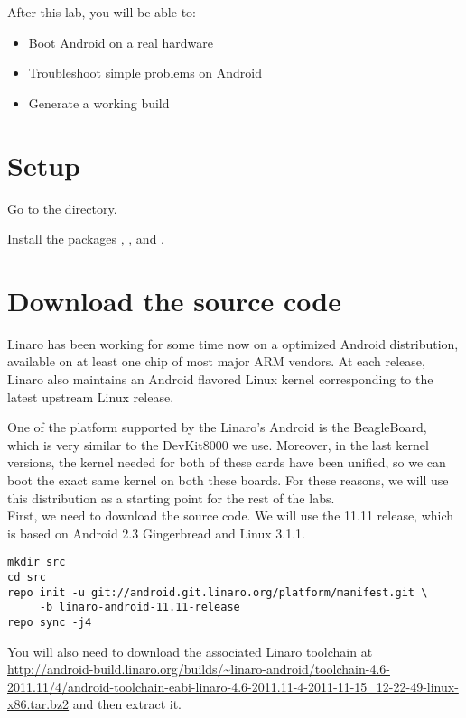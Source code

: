 
After this lab, you will be able to:
\begin{itemize}
  \item Boot Android on a real hardware
  \item Troubleshoot simple problems on Android
  \item Generate a working build
\end{itemize}

\section{Setup}

Go to the  directory.

Install the packages , ,
 and .

\section{Download the source code}

Linaro has been working for some time now on a optimized Android distribution,
available on at least one chip of most major ARM vendors. At each release,
Linaro also maintains an Android flavored Linux kernel corresponding to the latest
upstream Linux release.

One of the platform supported by the Linaro's Android is the BeagleBoard, which
is very similar to the DevKit8000 we use. Moreover, in the last kernel versions,
the kernel needed for both of these cards have been unified, so we can boot the
exact same kernel on both these boards. For these reasons, we will use this
distribution as a starting point for the rest of the labs.\\

First, we need to download the source code. We will use the 11.11 release, which
is based on Android 2.3 Gingerbread and Linux 3.1.1.

\begin{verbatim}
mkdir src
cd src
repo init -u git://android.git.linaro.org/platform/manifest.git \
     -b linaro-android-11.11-release
repo sync -j4
\end{verbatim}

You will also need to download the associated Linaro toolchain at
\url{http://android-build.linaro.org/builds/~linaro-android/toolchain-4.6-2011.11/4/android-toolchain-eabi-linaro-4.6-2011.11-4-2011-11-15_12-22-49-linux-x86.tar.bz2} and then extract it.

